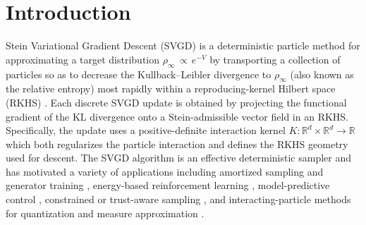 \documentclass[reqno, 11pt]{amsart}
\numberwithin{equation}{section}
\theoremstyle{definition}
\begin{document}
    \section{Introduction}
    Stein Variational Gradient Descent (SVGD) is a deterministic particle method for approximating a target distribution $\rho_\infty\,\propto\,e^{-V}$ by transporting a collection of particles so as to decrease the Kullback--Leibler divergence to $\rho_\infty$ (also known as the relative entropy) most rapidly within a reproducing-kernel Hilbert space (RKHS) \cite{liu_wang_2016_stein}. Each discrete SVGD update is obtained by projecting the functional gradient of the $\mathrm{KL}$ divergence onto a Stein-admissible vector field in an RKHS. Specifically, the update uses a positive-definite interaction kernel $K:\mathbb{R}^{d}\times\mathbb{R}^{d}\rightarrow\mathbb{R}$ which both regularizes the particle interaction and defines the RKHS geometry used for descent. The SVGD algorithm is an effective deterministic sampler and has motivated a variety of applications including amortized sampling and generator training \cite{feng_wang_liu_2017_learning}, energy-based reinforcement learning \cite{haarnoja_tang_abbeel_levine_2017_reinforcement}, model-predictive control \cite{lambert_ramos_boots_fox_fishman_2021_stein}, constrained or trust-aware sampling \cite{liu_tong_liu_2021_sampling}, and interacting-particle methods for quantization and measure approximation \cite{xu_korba_slepcev_2022_accurate}.\\
    
\end{document}
